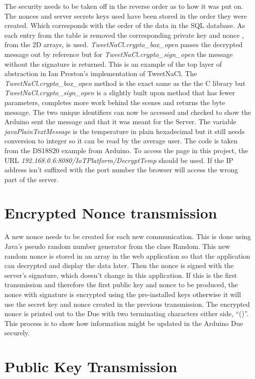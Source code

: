The security needs to be taken off in the reverse order as to how it was put on. The nonces and server secrets keys used have been stored in the order they were created. Which corresponds with the order of the data in the SQL database. As each entry from the table is removed the corresponding private key and nonce , from the 2D arrays, is used. \emph{TweetNaCl.crypto\_box\_open} passes the decrypted message out by reference but for \emph{TweetNaCl.crypto\_sign\_open} the message without the signature is returned. This is an example of the top layer of abstraction in Ian Preston's implementation of TweetNaCl. The  \emph{TweetNaCl.crypto\_box\_open} method is the exact same as the the C library but \emph{TweetNaCl.crypto\_sign\_open} is a slightly built upon method that has fewer parameters, completes more work behind the scenes and returns the byte message. The two unique identifiers can now be accessed and checked to show the Arduino sent the message and that it was meant for the Server. The variable \emph{javaPlainTextMessage} is the temperature in plain hexadecimal but it still needs conversion to integer so it can be read by the average user. The code is taken from the DS18S20 example from Arduino\cite{onewire}. To access the page in this project, the URL \emph{192.168.0.6:8080/IoTPlatform/DecryptTemp} should be used. If the IP address isn't suffixed with the port number the browser will access the wrong part of the server.

\section{Encrypted Nonce transmission}
\label{nonce}
A new nonce needs to be created for each new communication. This is done using Java's pseudo random number generator from the class Random. This new random nonce is stored in an array in the web application so that the application can decrypted and display the data later. Then the nonce is signed with the server's signature, which doesn't change in this application. If this is the first transmission and therefore the first public key and nonce to be produced, the nonce with signature is encrypted using the pre-installed keys otherwise it will use the secret key and nonce created in the previous transmission. The encrypted nonce is printed out to the Due with two terminating characters either side, ``()''. This process is to show how information might be updated in the Arduino Due securely.

\section{Public Key Transmission}
\label{pktransmit}

